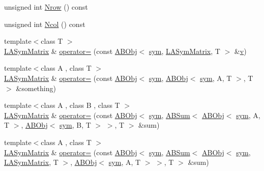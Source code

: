 \begin{DoxyCompactItemize}
unsigned int \mbox{\hyperlink{classROOT_1_1Minuit2_1_1LASymMatrix_ac76b44933bc4b144b8671c089b8d7ef5}{Nrow}} () const
\item 
unsigned int \mbox{\hyperlink{classROOT_1_1Minuit2_1_1LASymMatrix_a36bb0f349110a80cb742953ae68fc9c5}{Ncol}} () const
\item 
{\footnotesize template$<$class T $>$ }\\\mbox{\hyperlink{classROOT_1_1Minuit2_1_1LASymMatrix}{L\+A\+Sym\+Matrix}} \& \mbox{\hyperlink{classROOT_1_1Minuit2_1_1LASymMatrix_a6c1a413ac701804116e0e395334edc3b}{operator=}} (const \mbox{\hyperlink{classROOT_1_1Minuit2_1_1ABObj}{A\+B\+Obj}}$<$ \mbox{\hyperlink{classROOT_1_1Minuit2_1_1sym}{sym}}, \mbox{\hyperlink{classROOT_1_1Minuit2_1_1LASymMatrix}{L\+A\+Sym\+Matrix}}, T $>$ \&\mbox{\hyperlink{hadron__timeslice_8cc_a716fc87f5e814be3ceee2405ed6ff22a}{v}})
\item 
{\footnotesize template$<$class A , class T $>$ }\\\mbox{\hyperlink{classROOT_1_1Minuit2_1_1LASymMatrix}{L\+A\+Sym\+Matrix}} \& \mbox{\hyperlink{classROOT_1_1Minuit2_1_1LASymMatrix_ad9610e3f4b18a52ab16644373e179acc}{operator=}} (const \mbox{\hyperlink{classROOT_1_1Minuit2_1_1ABObj}{A\+B\+Obj}}$<$ \mbox{\hyperlink{classROOT_1_1Minuit2_1_1sym}{sym}}, \mbox{\hyperlink{classROOT_1_1Minuit2_1_1ABObj}{A\+B\+Obj}}$<$ \mbox{\hyperlink{classROOT_1_1Minuit2_1_1sym}{sym}}, A, T $>$, T $>$ \&something)
\item 
{\footnotesize template$<$class A , class B , class T $>$ }\\\mbox{\hyperlink{classROOT_1_1Minuit2_1_1LASymMatrix}{L\+A\+Sym\+Matrix}} \& \mbox{\hyperlink{classROOT_1_1Minuit2_1_1LASymMatrix_a88d40828624a6418f8b94e239e30d322}{operator=}} (const \mbox{\hyperlink{classROOT_1_1Minuit2_1_1ABObj}{A\+B\+Obj}}$<$ \mbox{\hyperlink{classROOT_1_1Minuit2_1_1sym}{sym}}, \mbox{\hyperlink{classROOT_1_1Minuit2_1_1ABSum}{A\+B\+Sum}}$<$ \mbox{\hyperlink{classROOT_1_1Minuit2_1_1ABObj}{A\+B\+Obj}}$<$ \mbox{\hyperlink{classROOT_1_1Minuit2_1_1sym}{sym}}, A, T $>$, \mbox{\hyperlink{classROOT_1_1Minuit2_1_1ABObj}{A\+B\+Obj}}$<$ \mbox{\hyperlink{classROOT_1_1Minuit2_1_1sym}{sym}}, B, T $>$ $>$, T $>$ \&sum)
\item 
{\footnotesize template$<$class A , class T $>$ }\\\mbox{\hyperlink{classROOT_1_1Minuit2_1_1LASymMatrix}{L\+A\+Sym\+Matrix}} \& \mbox{\hyperlink{classROOT_1_1Minuit2_1_1LASymMatrix_abaf8a2feeb04c66aca17e5876dd7aaff}{operator=}} (const \mbox{\hyperlink{classROOT_1_1Minuit2_1_1ABObj}{A\+B\+Obj}}$<$ \mbox{\hyperlink{classROOT_1_1Minuit2_1_1sym}{sym}}, \mbox{\hyperlink{classROOT_1_1Minuit2_1_1ABSum}{A\+B\+Sum}}$<$ \mbox{\hyperlink{classROOT_1_1Minuit2_1_1ABObj}{A\+B\+Obj}}$<$ \mbox{\hyperlink{classROOT_1_1Minuit2_1_1sym}{sym}}, \mbox{\hyperlink{classROOT_1_1Minuit2_1_1LASymMatrix}{L\+A\+Sym\+Matrix}}, T $>$, \mbox{\hyperlink{classROOT_1_1Minuit2_1_1ABObj}{A\+B\+Obj}}$<$ \mbox{\hyperlink{classROOT_1_1Minuit2_1_1sym}{sym}}, A, T $>$ $>$, T $>$ \&sum)

\end{DoxyCompactItemize}
